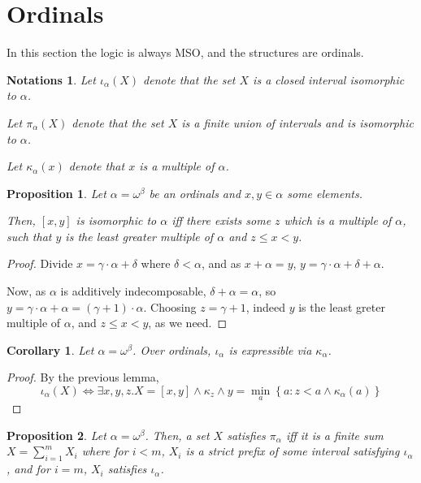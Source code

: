 \documentclass{article}
\newtheorem{corollary}{Corollary}
\newtheorem{proposition}{Proposition}
\newtheorem{notations}{Notations}
\newcommand{\parens}[1]{\left( {#1} \right)}
\newcommand{\brackets}[1]{\left[ {#1} \right]}
\newcommand{\braces}[1]{\left\{ {#1} \right\}}
\newcommand{\setcomp}[1]{\braces{#1}}
\newcommand{\ii}[1]{{\iota}_{#1}}
\newcommand{\kk}[1]{{\kappa}_{#1}}
\newcommand{\pp}[1]{{\pi}_{#1}}
\begin{document}
\section{Ordinals}

In this section the logic is always MSO, and the structures are ordinals.

\begin{notations}
    Let $\ii{\alpha} \parens{X}$ denote
    that the set $X$ is a closed interval isomorphic to $\alpha$.

    Let $\pp{\alpha} \parens{X}$ denote
    that the set $X$ is a finite union of intervals and is isomorphic to $\alpha$.

    Let $\kk{\alpha} \parens{x}$ denote
    that $x$ is a multiple of $\alpha$.
\end{notations}


\begin{proposition}
    Let $\alpha = \omega^\beta$ be an ordinals
    and $x, y \in \alpha$ some elements.

    Then,
    $\brackets{x, y}$ is isomorphic to $\alpha$
    iff there exists some $z$ which is a multiple of $\alpha$,
    such that $y$ is the least greater multiple of $\alpha$ and $z \le x < y$.
\end{proposition}

\begin{proof}
    Divide $x = \gamma \cdot \alpha + \delta$ where $\delta < \alpha$, and as $x + \alpha = y$,
    $y = \gamma \cdot \alpha + \delta + \alpha$.

    Now, as $\alpha$ is additively indecomposable, $\delta + \alpha = \alpha$,
    so $y = \gamma \cdot \alpha + \alpha = \parens{\gamma + 1} \cdot \alpha$.
    Choosing $z = \gamma + 1$, indeed $y$ is the least greter multiple of $\alpha$,
    and $z \le x < y$, as we need.
\end{proof}

\begin{corollary}
    Let $\alpha = \omega^\beta$.
    Over ordinals, $\ii{\alpha}$ is expressible via $\kk{\alpha}$.
\end{corollary}

\begin{proof}
    By the previous lemma,
    $$\ii{\alpha} \parens{X}
    \iff
    \exists x, y, z. 
           X = \brackets{x, y}
    \wedge \kk{z}
    \wedge y = \min_a \setcomp{a : z < a \wedge \kk{\alpha} \parens{a}}$$
\end{proof}

\begin{proposition}
    Let $\alpha = \omega^\beta$.
    Then, a set $X$ satisfies $\pp{\alpha}$ iff it is a finite sum
    $X = \sum_{i=1}^m X_i$ where for $i<m$, $X_i$ is a strict prefix
    of some interval satisfying $\ii{\alpha}$, and
    for $i = m$, $X_i$ satisfies $\ii{\alpha}$.
\end{proposition}
\end{document}
